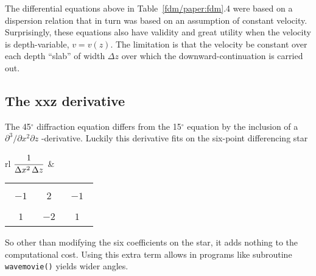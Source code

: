 \par
The differential equations above
in Table~\ref{fdm/paper:fdm}.4
were based on a dispersion relation
that in turn was based on an assumption of constant velocity.
Surprisingly, these equations also have validity and great utility
when the velocity is depth-variable,  $v = v(z)$.
The limitation is that the velocity be constant over each 
depth ``slab'' of width $\Delta z$ over which the downward-continuation
is carried out.


\subsection{The xxz derivative}
\par
The 45$^\circ$ diffraction equation differs from the 15$^\circ$ equation
by the inclusion of a  $ \partial^3 / \partial x^2 \partial z $ -derivative.
Luckily this derivative fits on the six-point differencing star
\begin{center}
\begin{tabular}{rl}
$\displaystyle {\strut 1\over\Delta x^2\,\Delta z}$ &
  \begin{tabular}{|c|c|c|} \hline
 & &  \\   \ $-1$\ & \ 2\  &\ $-1$\ \\  & &  \\  \hline
 & &  \\     $ 1$  & $-2$  &  $ 1$  \\  & &  \\  \hline
  \end{tabular}
\end{tabular}
\end{center}
So other than modifying the six coefficients on the star,
it adds nothing to the computational cost.
Using this extra term allows in programs like
subroutine \texttt{wavemovie()}  yields wider angles.

\par
{}
%

